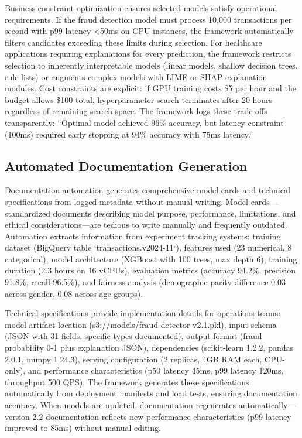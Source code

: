 Business constraint optimization ensures selected models satisfy operational requirements. If the fraud detection model must process 10,000 transactions per second with p99 latency <50ms on CPU instances, the framework automatically filters candidates exceeding these limits during selection. For healthcare applications requiring explanations for every prediction, the framework restricts selection to inherently interpretable models (linear models, shallow decision trees, rule lists) or augments complex models with LIME or SHAP explanation modules. Cost constraints are explicit: if GPU training costs \$5 per hour and the budget allows \$100 total, hyperparameter search terminates after 20 hours regardless of remaining search space. The framework logs these trade-offs transparently: ``Optimal model achieved 96\% accuracy, but latency constraint (100ms) required early stopping at 94\% accuracy with 75ms latency.``

\subsection{Automated Documentation Generation}

Documentation automation generates comprehensive model cards and technical specifications from logged metadata without manual writing. Model cards---standardized documents describing model purpose, performance, limitations, and ethical considerations---are tedious to write manually and frequently outdated. Automation extracts information from experiment tracking systems: training dataset (BigQuery table `transactions.v2024-11`), features used (23 numerical, 8 categorical), model architecture (XGBoost with 100 trees, max depth 6), training duration (2.3 hours on 16 vCPUs), evaluation metrics (accuracy 94.2\%, precision 91.8\%, recall 96.5\%), and fairness analysis (demographic parity difference 0.03 across gender, 0.08 across age groups).

Technical specifications provide implementation details for operations teams: model artifact location (s3://models/fraud-detector-v2.1.pkl), input schema (JSON with 31 fields, specific types documented), output format (fraud probability 0-1 plus explanation JSON), dependencies (scikit-learn 1.2.2, pandas 2.0.1, numpy 1.24.3), serving configuration (2 replicas, 4GB RAM each, CPU-only), and performance characteristics (p50 latency 45ms, p99 latency 120ms, throughput 500 QPS). The framework generates these specifications automatically from deployment manifests and load tests, ensuring documentation accuracy. When models are updated, documentation regenerates automatically---version 2.2 documentation reflects new performance characteristics (p99 latency improved to 85ms) without manual editing.

